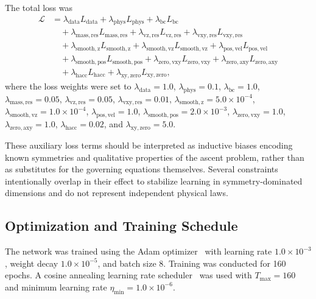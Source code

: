The total loss was
\begin{equation}
\begin{split}
  \mathcal{L} &= \lambda_\mathrm{data} L_\mathrm{data} +
  \lambda_\mathrm{phys} L_\mathrm{phys} +
  \lambda_\mathrm{bc} L_\mathrm{bc} \\
  &\quad + \lambda_\mathrm{mass,res} L_\mathrm{mass,res} +
  \lambda_\mathrm{vz,res} L_\mathrm{vz,res} +
  \lambda_\mathrm{vxy,res} L_\mathrm{vxy,res} \\
  &\quad + \lambda_\mathrm{smooth,z} L_\mathrm{smooth,z} +
  \lambda_\mathrm{smooth,vz} L_\mathrm{smooth,vz} +
  \lambda_\mathrm{pos,vel} L_\mathrm{pos,vel} \\
  &\quad + \lambda_\mathrm{smooth,pos} L_\mathrm{smooth,pos} +
  \lambda_\mathrm{zero,vxy} L_\mathrm{zero,vxy} +
  \lambda_\mathrm{zero,axy} L_\mathrm{zero,axy} \\
  &\quad + \lambda_\mathrm{hacc} L_\mathrm{hacc} +
  \lambda_\mathrm{xy,zero} L_\mathrm{xy,zero},
\end{split}
\end{equation}
where the loss weights were set to \(\lambda_\mathrm{data} = 1.0\),
\(\lambda_\mathrm{phys} = 0.1\), \(\lambda_\mathrm{bc} = 1.0\),
\(\lambda_\mathrm{mass,res} = 0.05\), \(\lambda_\mathrm{vz,res} = 0.05\),
\(\lambda_\mathrm{vxy,res} = 0.01\), \(\lambda_\mathrm{smooth,z} = 5.0 \times
10^{-4}\), \(\lambda_\mathrm{smooth,vz} = 1.0 \times 10^{-4}\),
\(\lambda_\mathrm{pos,vel} = 1.0\), \(\lambda_\mathrm{smooth,pos} = 2.0 \times
10^{-3}\), \(\lambda_\mathrm{zero,vxy} = 1.0\), \(\lambda_\mathrm{zero,axy} =
1.0\), \(\lambda_\mathrm{hacc} = 0.02\), and \(\lambda_\mathrm{xy,zero} = 5.0\).

These auxiliary loss terms should be interpreted as inductive biases encoding known symmetries and qualitative properties of the ascent problem, rather than as substitutes for the governing equations themselves. Several constraints intentionally overlap in their effect to stabilize learning in symmetry-dominated dimensions and do not represent independent physical laws.

\subsection{Optimization and Training Schedule}

The network was trained using the Adam optimizer~\cite{kingma2015} with learning rate \(1.0 \times
10^{-3}\), weight decay \(1.0 \times 10^{-5}\), and batch size 8. Training was
conducted for 160 epochs. A cosine annealing learning rate scheduler~\cite{loshchilov2017} was used
with \(T_\mathrm{max} = 160\) and minimum learning rate \(\eta_\mathrm{min} = 1.0
\times 10^{-6}\).

